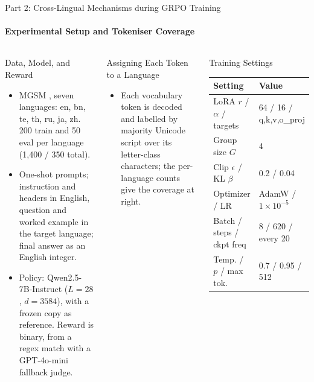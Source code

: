 \documentclass[aspectratio=169]{beamer}
\begin{document}
	\begin{frame}{Part 2: Cross-Lingual Mechanisms during GRPO Training}
		\framesubtitle{Experimental Setup and Tokeniser Coverage}
		\begin{columns}
			\begin{block}{\scriptsize Data, Model, and Reward}\scriptsize
				\begin{itemize}
					\item MGSM \autocite{shi2022mgsm}, seven languages: en, bn, te, th, ru, ja, zh. 200 train and 50 eval per language (1{,}400 / 350 total).
					\item One-shot prompts; instruction and headers in English, question and worked example in the target language; final answer as an English integer.
					\item Policy: Qwen2.5-7B-Instruct ($L=28$, $d=3584$), with a frozen copy as reference. Reward is binary, from a regex match with a GPT-4o-mini fallback judge.
				\end{itemize}
			\end{block}
			\begin{block}{\scriptsize Assigning Each Token to a Language}\scriptsize
				\begin{itemize}
					\item Each vocabulary token is decoded and labelled by majority Unicode script over its letter-class characters; the per-language counts give the coverage at right.
				\end{itemize}
			\end{block}
			\begin{block}{\scriptsize Training Settings}\tiny
				\centering
				\renewcommand{\arraystretch}{1.1}
				\begin{tabular}{ll}
					\toprule
					Setting & Value \\
					\midrule
					LoRA $r$ / $\alpha$ / targets & 64 / 16 /  q,k,v,o\_proj  \\
					Group size $G$ & 4 \\
					Clip $\epsilon$ / KL $\beta$ & 0.2 / 0.04 \\
					Optimizer / LR & AdamW / $1\times10^{-5}$ \\
					Batch / steps / ckpt freq & 8 / 620 / every 20 \\
					Temp. / $p$ / max tok. & 0.7 / 0.95 / 512 \\

\end{tabular}
\end{block}
\end{columns}
\end{frame}
\end{document}
